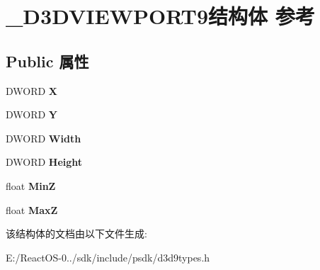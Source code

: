 \hypertarget{struct___d3_d_v_i_e_w_p_o_r_t9}{}\section{\+\_\+\+D3\+D\+V\+I\+E\+W\+P\+O\+R\+T9结构体 参考}
\label{struct___d3_d_v_i_e_w_p_o_r_t9}
\subsection*{Public 属性}
\begin{DoxyCompactItemize}
\item 
\mbox{\label{struct___d3_d_v_i_e_w_p_o_r_t9_a769e4d0dab7c58e0f209509027fe7314}} 
D\+W\+O\+RD {\bfseries X}
\item 
\mbox{\label{struct___d3_d_v_i_e_w_p_o_r_t9_afce49e71550745daa4adffe67279654d}} 
D\+W\+O\+RD {\bfseries Y}
\item 
\mbox{\label{struct___d3_d_v_i_e_w_p_o_r_t9_a0064efcbe721b77c67c3f030379bcf77}} 
D\+W\+O\+RD {\bfseries Width}
\item 
\mbox{\label{struct___d3_d_v_i_e_w_p_o_r_t9_a13d4f3e2b9c78e03a29a3a176d02b935}} 
D\+W\+O\+RD {\bfseries Height}
\item 
\mbox{\label{struct___d3_d_v_i_e_w_p_o_r_t9_a7104b806b26961805c4d572304515273}} 
float {\bfseries MinZ}
\item 
\mbox{\label{struct___d3_d_v_i_e_w_p_o_r_t9_a82e6657687aef17083ccda86728a9853}} 
float {\bfseries MaxZ}
\end{DoxyCompactItemize}


该结构体的文档由以下文件生成\+:\begin{DoxyCompactItemize}
\item 
E\+:/\+React\+O\+S-\/0../sdk/include/psdk/d3d9types.\+h\end{DoxyCompactItemize}
